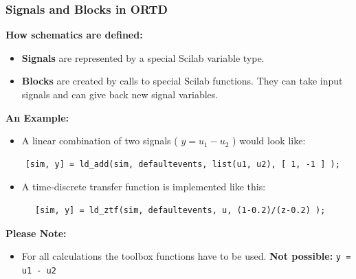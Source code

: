\documentclass[serif,9pt,xcolor=dvipsnames]{beamer}
\begin{document}
\begin{frame}[fragile]
    \frametitle{Signals and Blocks in ORTD}

\textbf{How schematics are defined:}

  \begin{itemize}
  \item \textbf{Signals} are represented by a special Scilab variable type.
  \item \textbf{Blocks} are created by calls to special Scilab functions. They can take input signals and can give back new signal variables.
  \end{itemize}

\textbf{An Example:}
  \begin{itemize}
  \item A linear combination of two signals ( $y=u_1 - u_2$ ) would look like:
  \end{itemize}

  {\small 
  \begin{lstlisting}
    [sim, y] = ld_add(sim, defaultevents, list(u1, u2), [ 1, -1 ] );
  \end{lstlisting}}
    

  \begin{itemize}
  \item A time-discrete transfer function is implemented like this:
  \end{itemize}

  {\small 
  \begin{lstlisting} 
      [sim, y] = ld_ztf(sim, defaultevents, u, (1-0.2)/(z-0.2) );
  \end{lstlisting}}

\textbf{Please Note:}
  \begin{itemize}
  \item For all calculations the toolbox functions have to be used. \textbf{Not possible:} \texttt{y = u1 - u2}
  \end{itemize}
  


\end{frame}
\end{document}
